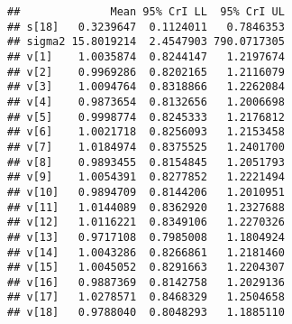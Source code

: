 \documentclass[]{article}
\newenvironment{Shaded}{\begin{snugshade}}{\end{snugshade}}
\newcommand{\CommentTok}[1]{\textcolor[rgb]{0.56,0.35,0.01}{\textit{#1}}}
\newcommand{\ControlFlowTok}[1]{\textcolor[rgb]{0.13,0.29,0.53}{\textbf{#1}}}
\newcommand{\DataTypeTok}[1]{\textcolor[rgb]{0.13,0.29,0.53}{#1}}
\newcommand{\DecValTok}[1]{\textcolor[rgb]{0.00,0.00,0.81}{#1}}
\newcommand{\FloatTok}[1]{\textcolor[rgb]{0.00,0.00,0.81}{#1}}
\newcommand{\KeywordTok}[1]{\textcolor[rgb]{0.13,0.29,0.53}{\textbf{#1}}}
\newcommand{\NormalTok}[1]{#1}
\newcommand{\OperatorTok}[1]{\textcolor[rgb]{0.81,0.36,0.00}{\textbf{#1}}}
\newcommand{\StringTok}[1]{\textcolor[rgb]{0.31,0.60,0.02}{#1}}
\begin{document}
\begin{Shaded}
\end{Shaded}

\begin{verbatim}
##              Mean 95% CrI LL  95% CrI UL
## s[18]   0.3239647  0.1124011   0.7846353
## sigma2 15.8019214  2.4547903 790.0717305
## v[1]    1.0035874  0.8244147   1.2197674
## v[2]    0.9969286  0.8202165   1.2116079
## v[3]    1.0094764  0.8318866   1.2262084
## v[4]    0.9873654  0.8132656   1.2006698
## v[5]    0.9998774  0.8245333   1.2176812
## v[6]    1.0021718  0.8256093   1.2153458
## v[7]    1.0184974  0.8375525   1.2401700
## v[8]    0.9893455  0.8154845   1.2051793
## v[9]    1.0054391  0.8277852   1.2221494
## v[10]   0.9894709  0.8144206   1.2010951
## v[11]   1.0144089  0.8362920   1.2327688
## v[12]   1.0116221  0.8349106   1.2270326
## v[13]   0.9717108  0.7985008   1.1804924
## v[14]   1.0043286  0.8266861   1.2181460
## v[15]   1.0045052  0.8291663   1.2204307
## v[16]   0.9887369  0.8142758   1.2029136
## v[17]   1.0278571  0.8468329   1.2504658
## v[18]   0.9788040  0.8048293   1.1885110
\end{verbatim}
\end{document}
